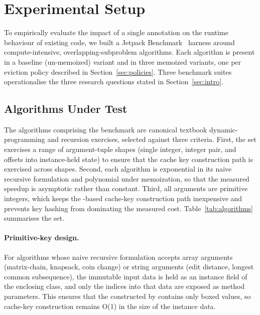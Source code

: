 \section{Experimental Setup}\label{sec:study}

To empirically evaluate the impact of a single  annotation on the runtime behaviour of existing code, we built a Jetpack Benchmark~\cite{jetpackbenchmark} harness around \numAlgorithms compute-intensive, overlapping-subproblem algorithms. Each algorithm is present in a baseline (un-memoized) variant and in three memoized variants, one per eviction policy described in Section~\ref{sec:policies}. Three benchmark suites operationalise the three research questions stated in Section~\ref{sec:intro}.

\subsection{Algorithms Under Test}\label{sec:algorithms}

The \numAlgorithms algorithms comprising the benchmark are canonical textbook dynamic-programming and recursion exercises, selected against three criteria. First, the set exercises a range of argument-tuple shapes (single integer, integer pair, and offsets into instance-held state) to ensure that the cache key construction path is exercised across shapes. Second, each algorithm is exponential in its naive recursive formulation and polynomial under memoization, so that the measured speedup is asymptotic rather than constant. Third, all arguments are primitive integers, which keeps the -based cache-key construction path inexpensive and prevents key hashing from dominating the measured cost. Table~\ref{tab:algorithms} summarises the set.



\paragraph{Primitive-key design.} For algorithms whose naive recursive formulation accepts array arguments (matrix-chain, knapsack, coin change) or string arguments (edit distance, longest common subsequence), the immutable input data is held as an instance field of the enclosing class, and only the indices into that data are exposed as method parameters. This ensures that the  constructed by  contains only boxed  values, so cache-key construction remains O(1) in the size of the instance data.

